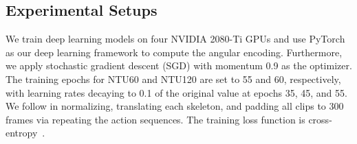 \documentclass[journal,comsoc]{IEEEtran}
\begin{document}
\subsection{Experimental Setups}
We train deep learning models on four NVIDIA 2080-Ti GPUs and use PyTorch as our deep learning framework to compute the angular encoding. Furthermore, we apply stochastic gradient descent (SGD) with momentum 0.9 as the optimizer. The training epochs for NTU60 and NTU120 are set to 55 and 60, respectively, with learning rates decaying to 0.1 of the original value at epochs 35, 45, and 55. We follow \cite{shi2019skeleton} in normalizing, translating each skeleton, and padding all clips to 300 frames via repeating the action sequences. The training loss function is cross-entropy~\cite{qin2019rethinking}.

\begin{table}[t]
\centering
\caption{Independently evaluation of angular encoding for each category. XSub and XView represent cross-subject and cross-view. XSet means cross-setup. } 
\label{table:eval_each_ang}
\end{table}
\end{document}
